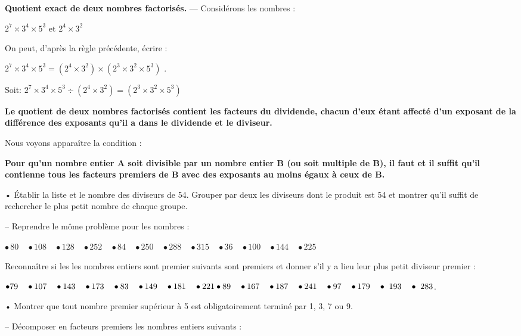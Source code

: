 \textbf {Quotient exact de deux nombres factorisés.} — Considérons les nombres :

 \centerline{$2^7 \times 3^4 \times 5^3 \text{  et  } 2^4 \times 3^2$}
 
 On peut, d'après la règle précédente, écrire : 
 
 \centerline{$2^7 \times 3^4 \times 5^3 = (2^4 \times 3^2) \times (2^3 \times 3^2 \times 5^3)$ .}
 
 Soit: $2^7 \times 3^4 \times 5^3 \div (2^4 \times 3^2) = (2^3 \times 3^2 \times 5^3)$
 
\textbf{\label{Quotient_exact}
Le quotient de deux nombres factorisés contient les facteurs du dividende, chacun d'eux étant affecté d'un exposant de la différence des exposants qu'il a dans le dividende et le diviseur.}
 
 Nous voyons apparaître la condition : 
 
 \textbf{Pour qu'un nombre entier A soit divisible par un nombre entier B (ou soit multiple de B), il faut et il suffit qu'il contienne tous les facteurs premiers de B avec des exposants au moins égaux à ceux de B.} 
 
 


• Établir la liste et le nombre des diviseurs de 54. Grouper par deux les diviseurs dont le produit est 54 et montrer qu'il suffit de rechercher le plus petit nombre de chaque groupe. 


-- Reprendre le môme problème pour les nombres : 


$ \bullet\, 80 \quad  \bullet 108   \quad  \bullet 128  \quad  \bullet  252  \quad  \bullet  84  \quad  \bullet  250  \quad  \bullet 288  \quad  \bullet  315  \quad  \bullet  36  \quad  \bullet 100  \quad  \bullet 144  \quad  \bullet 225 $


Reconnaître si les  les nombres entiers sont premier suivants sont premiers et donner s'il y a lieu leur plus petit  diviseur premier :

$  \bullet  79  \quad  \bullet  107 \quad  \bullet  143  \quad  \bullet 173 \quad  \bullet  83 \quad  \bullet  149 \quad  \bullet  181 \quad  \bullet  221 \\
\bullet 89 \quad  \bullet 167 \quad  \bullet 187 \quad  \bullet  241 \quad  \bullet  97 \quad  \bullet 179 \quad  \bullet~193 \quad  \bullet~283$. 


• Montrer que tout nombre premier supérieur à 5 est obligatoirement terminé par 1, 3, 7 ou 9. 

--  Décomposer en facteurs premiers les nombres entiers suivants : 


